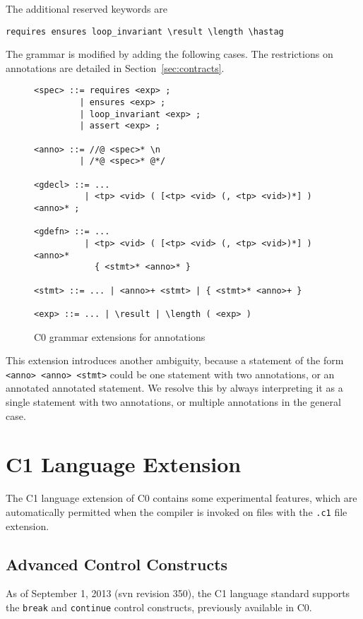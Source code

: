 \documentclass[11pt]{article}
\begin{document}
The additional reserved keywords are
\begin{verbatim}
requires ensures loop_invariant \result \length \hastag
\end{verbatim}
The grammar is modified by adding the following cases.  The
restrictions on annotations are detailed in
Section~\ref{sec:contracts}.

\begin{figure}
\begin{small}
\begin{verbatim}
<spec> ::= requires <exp> ;
         | ensures <exp> ;
         | loop_invariant <exp> ;
         | assert <exp> ;

<anno> ::= //@ <spec>* \n
         | /*@ <spec>* @*/

<gdecl> ::= ...
          | <tp> <vid> ( [<tp> <vid> (, <tp> <vid>)*] ) <anno>* ;

<gdefn> ::= ...
          | <tp> <vid> ( [<tp> <vid> (, <tp> <vid>)*] ) <anno>*
            { <stmt>* <anno>* }

<stmt> ::= ... | <anno>+ <stmt> | { <stmt>* <anno>+ }

<exp> ::= ... | \result | \length ( <exp> )
\end{verbatim}
\end{small}
\caption{C0 grammar extensions for annotations}
\end{figure}

This extension introduces another ambiguity, because a statement of the
form \verb'<anno> <anno> <stmt>' could be one statement with two
annotations, or an annotated annotated statement.  We resolve this by
always interpreting it as a single statement with two annotations, or
multiple annotations in the general case.

\section{C1 Language Extension}
\label{sec:c1}

The C1 language extension of C0 contains some experimental features,
which are automatically permitted when the compiler is invoked on
files with the \verb'.c1' file extension.

\subsection{Advanced Control Constructs}

As of September 1, 2013 (svn revision 350), the C1 language standard
supports the \verb'break' and \verb'continue' control constructs,
previously available in C0.
\end{document}
